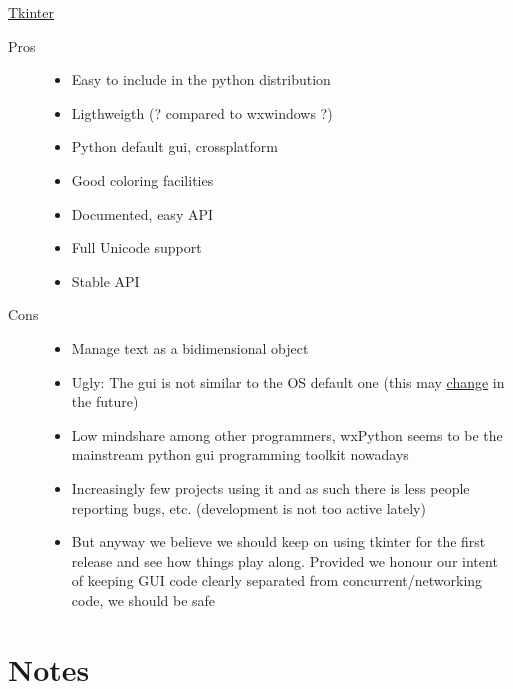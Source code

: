 \documentclass{report}
\begin{document}
\href{http://www.python.org/topics/tkinter/}{Tkinter}

\begin{description}
\item [Pros]
    \begin{itemize}
    \item Easy to include in the python distribution
    \item Ligthweigth (? compared to wxwindows ?)
    \item Python default gui, crossplatform
    \item Good coloring facilities
    \item Documented, easy API
    \item Full Unicode support
    \item Stable API
    \end{itemize}

\item [Cons]
    \begin{itemize}
    \item Manage text as a bidimensional object
    \item Ugly: The gui is not similar to the OS default one (this may \href{http://tcl.projectforum.com/tk/47}{change} in the future)
    \item Low mindshare among other programmers, wxPython seems to be the mainstream python gui programming toolkit nowadays
    \item Increasingly few projects using it and as such there is less people reporting bugs, etc. (development is not too active lately)
    \item But anyway we believe we should keep on using tkinter for the first release and see how things play along. Provided we honour our intent of keeping GUI code clearly separated from concurrent/networking code, we should be safe
    \end{itemize}
\end{description}

\chapter{Notes}
\end{document}
